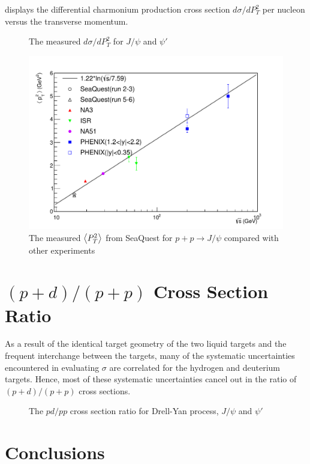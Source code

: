 \documentclass[reprint,aps,unsortedaddress,superscriptaddress,prd,floatfix,showpacs,linenumbers]{revtex4-2}
\begin{document}
 displays the differential charmonium production cross section $d\sigma/d P_T^2$
per nucleon versus the transverse momentum. 
\begin{figure}
	\caption{The measured $d\sigma/d P_T^2$ for $J/\psi$ and $\psi'$}
	\label{fig:pT_cross_sections}
\end{figure}

\begin{figure}
	\centering
	\includegraphics[width=\linewidth]{crossSections/pT/pT_s_release}
	\caption{The measured $\expval{P_T^2}$ from SeaQuest for $p+p\rightarrow J/\psi$ compared with other experiments \cite{clark1978,drapier1998,acharya2020}}
	\label{fig:pt_s}
\end{figure}

\section{$(p+d)/(p+p)$ Cross Section Ratio}
\label{sec:CSR}
As a result of the identical target geometry
of the two liquid targets and the frequent interchange between the targets,
many of the systematic uncertainties encountered in evaluating $\sigma$
are correlated for the hydrogen and deuterium targets. Hence, most of these
systematic uncertainties cancel out in the ratio of $(p+d)/(p+p)$ cross
sections.
\begin{figure}
	\caption{The $pd/pp$ cross section ratio for Drell-Yan process, $J/\psi$ and $\psi'$}
	\label{fig:pd/pp_csr}
\end{figure}

\section{Conclusions}
\label{sec:Conclusions}

\nocite{*}

\end{document}
